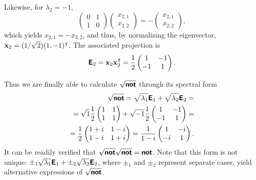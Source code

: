 {Likewise, for $\lambda_2=-1$,
\begin{equation}
\begin{pmatrix}
 0&1\\  1&0
\end{pmatrix}
\begin{pmatrix}
x_{2,1}\\x_{2,2}
\end{pmatrix}
=-\begin{pmatrix}
x_{2,1}\\x_{2,2}
\end{pmatrix}
,
\end{equation}
which yields  $x_{2,1}=-x_{2,2}$, and thus, by normalizing the eigenvector,
${\bf x}_2=(1/\sqrt{2})(1,-1)^\intercal $.
The associated projection is
\begin{equation}
\textsf{\textbf{E}}_2={\bf x}_2{\bf x}_2^\intercal =\frac{1}{2}
\begin{pmatrix}
 1&-1\\  -1&1
\end{pmatrix}
.
\end{equation}

Thus we are finally able to calculate
$\sqrt{\textsf{\textbf{not}}}$
through its spectral form
\begin{equation}
\begin{split}
\sqrt{\textsf{\textbf{not}}}=
\sqrt{\lambda_1}\textsf{\textbf{E}}_1 +
\sqrt{\lambda_2}\textsf{\textbf{E}}_2
=
\\=  \sqrt{1}
\frac{1}{2} \begin{pmatrix}
 1&1\\  1&1
\end{pmatrix}
+  \sqrt{-1}
\frac{1}{2} \begin{pmatrix}
 1&-1\\  -1&1
\end{pmatrix}
=
\\
=
\frac{1}{2}
\begin{pmatrix}
 1+i&1-i\\  1-i&1+i
\end{pmatrix}
=
\frac{1}{1-i}
\begin{pmatrix}
 1&-i\\  -i&1
\end{pmatrix}
.
\end{split}
\end{equation}
It can be readily verified that  $\sqrt{\textsf{\textbf{not}}}\sqrt{\textsf{\textbf{not}}}=\textsf{\textbf{not}}$.
Note that this form is not unique:
$\pm_1 \sqrt{\lambda_1}\textsf{\textbf{E}}_1 +
\pm_2 \sqrt{\lambda_2}\textsf{\textbf{E}}_2$, where $\pm_1$ and $\pm_2$ represent separate cases,
yield alternative expressions of $\sqrt{\textsf{\textbf{not}}}$.



\eexample
}

